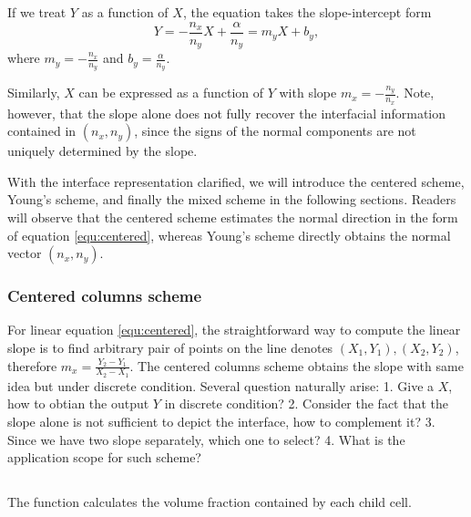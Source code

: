If we treat $Y$ as a function of $X$, the equation takes the slope-intercept form
\begin{equation}\label{equ:centered}
  Y = -\frac{n_x}{n_y} X + \frac{\alpha}{n_y} = m_y X + b_y,
\end{equation}
where $m_y = -\frac{n_x}{n_y}$ and $b_y = \frac{\alpha}{n_y}$.

Similarly, $X$ can be expressed as a function of $Y$ with slope $m_x = -\frac{n_y}{n_x}$. Note, however, that the slope alone does not fully recover the interfacial information contained in $(n_x, n_y)$, since the signs of the normal components are not uniquely determined by the slope.

With the interface representation clarified, we will introduce the centered scheme, Young's scheme, and finally the mixed scheme in the following sections. Readers will observe that the centered scheme estimates the normal direction in the form of equation \ref{equ:centered}, whereas Young's scheme directly obtains the normal vector $(n_x, n_y)$.

\subsubsection{Centered columns scheme}

For linear equation \ref{equ:centered}, the straightforward way to compute the linear slope is to find arbitrary pair of points on the line denotes $(X_1,Y_1),(X_2,Y_2)$, therefore $m_x = \frac{Y_2-Y_1}{X_2-X_1}$. The centered columns scheme obtains the slope with same idea but under discrete condition. Several question naturally arise: 1. Give a $X$, how to obtian the output $Y$ in discrete condition? 2. Consider the fact that the slope alone is not sufficient to depict the interface, how to complement it? 3. Since we have two slope separately, which one to select? 4. What is the application scope for such scheme?


\subsection{}
The  function calculates the volume fraction contained by each child cell.


